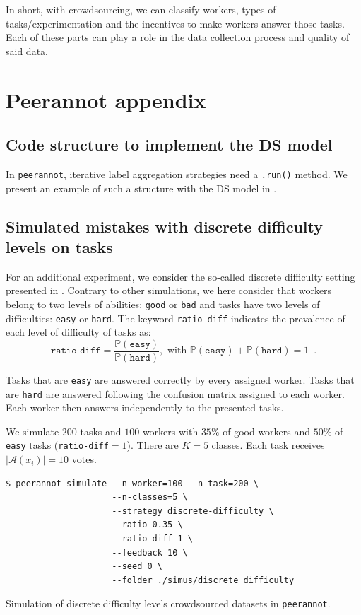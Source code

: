 In short, with crowdsourcing, we can classify workers, types of tasks/experimentation and the incentives to make workers answer those tasks. Each of these parts can play a role in the data collection process and quality of said data.

\chapter{Peerannot appendix}
\label{chap:app-peerannot}

\section{Code structure to implement the DS model}
\label{app:DS}

In \texttt{peerannot}, iterative label aggregation strategies need a \texttt{.run()} method. We present an example of such a structure with the DS model in .


\section{Simulated mistakes with discrete difficulty levels on tasks}
\label{sec:difficulty-levels}
For an additional experiment, we consider the so-called discrete difficulty setting presented in \citet{whitehill_whose_2009}. Contrary to other simulations, we here consider that workers belong to two levels of abilities: \texttt{good} or \texttt{bad} and tasks have two levels of difficulties: \texttt{easy} or \texttt{hard}. The keyword \texttt{ratio-diff} indicates the prevalence of each level of difficulty of tasks as:
\[\texttt{ratio-diff} = \frac{\mathbb{P}(\texttt{easy})}{\mathbb{P}(\texttt{hard})}, \text{ with }\mathbb{P}(\texttt{easy}) + \mathbb{P}(\texttt{hard})=1 \enspace.\]

Tasks that are \texttt{easy} are answered correctly by every assigned worker. Tasks that are \texttt{hard} are answered following the confusion matrix assigned to each worker. Each worker then answers independently to the presented tasks.

We simulate $200$ tasks and $100$ workers with $35\%$ of good workers and $50\%$ of \texttt{easy} tasks (\texttt{ratio-diff}$=1$). There are $K=5$ classes. Each task receives $|\mathcal{A}(x_i)|=10$ votes.
\begin{listing}[ht]
    \begin{verbatim}
$ peerannot simulate --n-worker=100 --n-task=200 \
                     --n-classes=5 \
                     --strategy discrete-difficulty \
                     --ratio 0.35 \
                     --ratio-diff 1 \
                     --feedback 10 \
                     --seed 0 \
                     --folder ./simus/discrete_difficulty
    \end{verbatim}
    \caption{Simulation of discrete difficulty levels crowdsourced datasets in \texttt{peerannot}.}
\label{listing:discrete_simu}
\end{listing}

